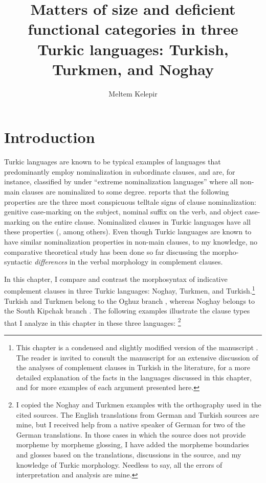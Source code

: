 \documentclass[output=paper]{langsci/langscibook}
\author{Meltem Kelepir\affiliation{Boğaziçi University}}
\title[Matters of size and deficient functional categories in three Turkic languages]
      {Matters of size and deficient functional categories in three Turkic languages: Turkish, Turkmen, and Noghay}
\begin{document}
\maketitle 

\section{Introduction}
\label{kelepirsec:key:1}

Turkic languages are known to be typical examples of languages that predominantly employ nominalization in subordinate clauses, 
and are, for instance, classified by \citet{Givon2009} under ``extreme nominalization languages'' where all non-main clauses are 
nominalized to some degree. 
\citeauthor{Givon2009} reports that the following properties are the three most conspicuous telltale signs of clause nominalization: 
genitive case-marking on the subject, 
nominal suffix on the verb, 
and object case-marking on the entire clause. 
Nominalized clauses in Turkic languages have all these properties (\citealp{Lees1965,Kornfilt1987,Taylan1998,BorsleyKornfilt2000,Kornfilt2007}, 
among others). 
Even though Turkic languages are known to have similar nominalization properties in non-main clauses, to my knowledge, 
no comparative theoretical study has been done so far discussing the morpho-syntactic \textit{differences} 
in the verbal morphology in complement clauses. 

In this chapter, %
I compare and contrast the morphosyntax of indicative complement clauses in three Turkic languages: Noghay, Turkmen, and Turkish.\footnote{%
    This chapter is a condensed and slightly modified version of the manuscript \citep{Kelepir2013}. 
    The reader is invited to consult the manuscript for an extensive discussion of the analyses of complement clauses in Turkish in the literature, 
    for a more detailed explanation of the facts in the languages discussed in this chapter, and for more examples of each argument presented here.
} 
Turkish and Turkmen belong to the Oghuz branch \citep{CsatoJohanson1998,Schonig1998}, 
whereas Noghay belongs to the South Kipchak branch \citep{CsatoKarakoc1998}. 
The following examples illustrate the clause types that I analyze in this chapter in these three languages:%
\footnote{%
    I copied the Noghay and Turkmen examples with the orthography used in the cited sources. 
    The English translations from German and Turkish sources are mine, 
    but I received help from a native speaker of German for two of the German translations. 
    In those cases in which the source does not provide morpheme by morpheme glossing, 
    I have added the morpheme boundaries and glosses based on the translations, discussions in the source, 
    and my knowledge of Turkic morphology. 
    Needless to say, all the errors of interpretation and analysis are mine.
} 
\end{document}
